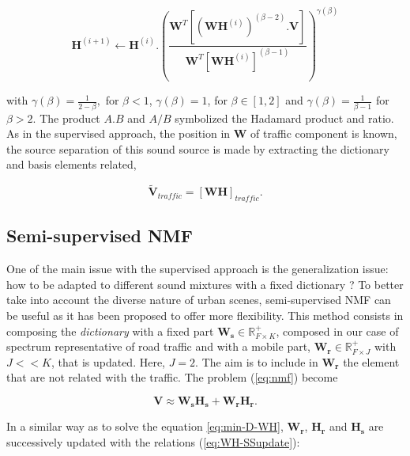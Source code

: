 \documentclass[twocolumn,a4paper,10pt]{article}
\begin{document}
\begin{equation}\label{eq:updateH_Sup}
\textbf{H}^{(i+1)} \leftarrow \textbf{H}^{(i)}.\left(\frac{\textbf{W}^T \left[\left(\textbf{WH}^{(i)} \right)^{(\beta-2)}.\textbf{V} \right]}{\textbf{W}^T \left[\textbf{WH}^{(i)} \right]^{(\beta-1)}}\right)^{\gamma(\beta)}
\end{equation}

with $\gamma(\beta) = \frac{1}{2-\beta},$ for $\beta < 1$, $ \gamma(\beta) = 1$, for $\beta \in \left[1,2\right]$ and $\gamma(\beta) = \frac{1}{\beta-1}$ for $\beta > 2$. The product $A.B$ and $A/B$ symbolized the Hadamard product and ratio. As in the supervised approach, the position in $\mathbf{W}$ of traffic component is known, the source separation of this sound source is made by extracting the dictionary and basis elements related,

\begin{equation}\label{eq:separationExtraction}
\mathbf{\tilde{V}}_{traffic} = \left[ \mathbf{WH} \right]_{traffic}.
\end{equation}

\subsection{Semi-supervised NMF}

One of the main issue with the supervised approach is the generalization issue: how to be adapted to different sound mixtures with a fixed dictionary ? To better take into account the diverse nature of urban scenes, semi-supervised NMF can be useful as it has been proposed \cite{lee_semi-supervised_2010} to offer more flexibility. This method consists in composing the \textit{dictionary} with a fixed part $\mathbf{W_s} \in \mathbb{R}^+_{F\times K}$, composed in our case of spectrum representative of road traffic and with a mobile part, $\mathbf{W_r} \in \mathbb{R}^+_{F\times J}$ with $J <<K$, that is updated. Here, $J = 2$. The aim is to include in $\mathbf{W_r}$ the element that are not related with the traffic. The problem (\ref{eq:nmf}) become

\begin{equation}
\mathbf{V} \approx \mathbf{W_s H_s}+ \mathbf{W_r H_r}.
\end{equation}

In a similar way as to solve the equation \ref{eq:min-D-WH}, $\mathbf{W_r}$, $\mathbf{H_r}$ and $\mathbf{H_s}$ are successively updated with the relations (\ref{eq:WH-SSupdate}):
\end{document}
